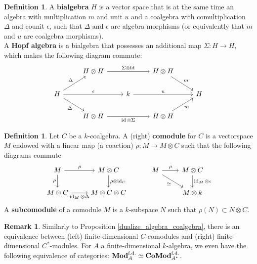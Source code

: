 \documentclass{article}
\theoremstyle{plain}
\theoremstyle{definition}
\newtheorem{definition}[theorem]{Definition}
\newtheorem{remark}{Remark}
\DeclareMathOperator{\id}{id}
\DeclareMathOperator{\Mod}{\bf{Mod}}
\DeclareMathOperator{\Comod}{\bf{CoMod}}
\begin{document}
\begin{definition}
    A \textbf{bialgebra} $H$ is a vector space that is at the same time an algebra with multiplication $m$ and unit $u$ and a coalgebra with comultiplication $\Delta$ and counit $\epsilon$, such that $\Delta$ and $\epsilon$ are algebra morphisms (or equivalently that $m$ and $u$ are coalgebra morphisms).\\
    A \textbf{Hopf algebra} is a bialgebra that possesses an additional map $\Sigma: H\rightarrow H$, which makes the following diagram commute:
    \[
    \begin{tikzcd}
        & H\otimes H
        \arrow[rr,"\Sigma\otimes \id"] &&
        H\otimes H
        \arrow[dr,"m"]\\
        H
        \arrow[ur,"\Delta"]
        \arrow[rr, "\epsilon"]
        \arrow[dr,"\Delta"']&&
        k
        \arrow[rr,"u"]&&
        H\\
        &H\otimes H
        \arrow[rr,"\id\otimes \Sigma"']&&
        H\otimes H
        \arrow[ur,"m"']   
    \end{tikzcd}
    \]
\end{definition}

\begin{definition}
\label{def_hopf_alg}
    Let $C$ be a $k$-coalgebra.
    A (right) \textbf{comodule} for $C$ is a vectorspace $M$ endowed with a linear map (a coaction) $\rho:M\rightarrow M \otimes C$ such that the following diagrams commute 
    \[
    \begin{tikzcd}
        M \arrow[r,"\rho"] \arrow[d, "\rho"'] & M \otimes C \arrow[d,"\rho \otimes \id_C"] \\
        M \otimes C \arrow[r,"\id_M \otimes \Delta"'] & M\otimes C\otimes C
    \end{tikzcd}
    \hspace{1cm}
    \begin{tikzcd}
        M \arrow[r, "\rho"]\arrow[dr, "\cong"']  &  M\otimes C \arrow[d,"\id_M\otimes \epsilon"] \\
         &  M \otimes k
    \end{tikzcd}
    \]
    A \textbf{subcomodule} of a comodule $M$ is a $k$-subspace $N$ such that $\rho(N)\subset N\otimes C$.
\end{definition}


\begin{remark}
    Similarly to Proposition \ref{dualize_algebra_coalgebra}, there is an equivalence between (left) finite-dimensional $C$-comodules and (right) finite-dimensional $C^*$-modules. 
    For $A$ a finite-dimensional $k$-algebra, we even have the following equivalence of categories: $\Mod^{\text{f.d.}}_A \simeq \Comod^{\text{f.d.}}_{A^*}$.
\end{remark}
\end{document}

